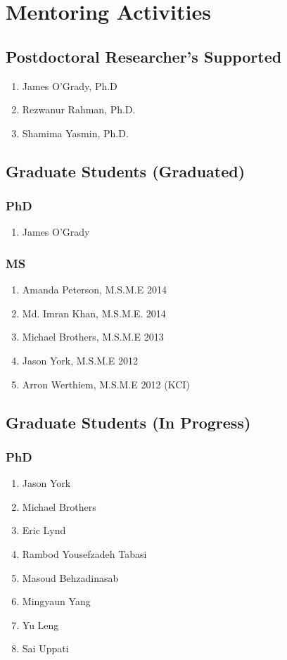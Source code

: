 \section*{Mentoring Activities}


\subsection*{Postdoctoral Researcher's Supported}
  \begin{enumerate}
    \item James O'Grady, Ph.D
    \item Rezwanur Rahman, Ph.D.
    \item Shamima Yasmin, Ph.D.
  \end{enumerate}

\subsection*{Graduate Students (Graduated)}

\subsubsection*{PhD}
\begin{enumerate}
  \item James O'Grady
\end{enumerate}

\subsubsection*{MS}
\begin{enumerate}
    \item Amanda Peterson, M.S.M.E 2014
    \item Md. Imran Khan, M.S.M.E. 2014
    \item Michael Brothers, M.S.M.E 2013
    \item Jason York, M.S.M.E 2012
    \item Arron Werthiem, M.S.M.E 2012 (KCI)
\end{enumerate}

\subsection*{Graduate Students (In Progress)}

\subsubsection*{PhD}
\begin{enumerate}
  \item Jason York
  \item Michael Brothers
  \item Eric Lynd
  \item Rambod Yousefzadeh Tabasi
  \item Masoud Behzadinasab
  \item Mingyaun Yang
  \item Yu Leng
  \item Sai Uppati
\end{enumerate}

